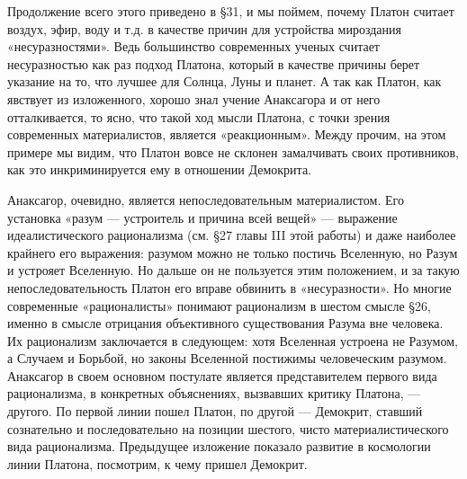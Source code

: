 Продолжение  всего  этого  приведено  в   §31,  и  мы  поймем,  почему
Платон  считает  воздух, эфир,  воду  и  т.д.  в качестве  причин  для
устройства мироздания  «несуразностями». Ведь  большинство современных
ученых  считает  несуразностью  как  раз  подход  Платона,  который  в
качестве  причины  берет  указание  на  то,  что  лучшее  для  Солнца,
Луны  и  планет.  А  так  как Платон,  как  явствует  из  изложенного,
хорошо знал  учение Анаксагора и  от него отталкивается, то  ясно, что
такой  ход мысли  Платона, с  точки зрения  современных материалистов,
является «реакционным».  Между прочим, на  этом примере мы  видим, что
Платон  вовсе  не  склонен  замалчивать  своих  противников,  как  это
инкриминируется ему в отношении Демокрита.

Анаксагор,  очевидно, является  непоследовательным материалистом.  Его
установка «разум  --- устроитель и  причина всей вещей»  --- выражение
идеалистического рационализма (см.  §27 главы III этой  работы) и даже
наиболее  крайнего  его выражения:  разумом  можно  не только  постичь
Вселенную, но Разум  и устрояет Вселенную. Но дальше  он не пользуется
этим  положением, и  за такую  непоследовательность Платон  его вправе
обвинить  в  «несуразности».   Но  многие  современные  «рационалисты»
понимают рационализм  в шестом смысле  §26, именно в  смысле отрицания
объективного  существования   Разума  вне  человека.   Их  рационализм
заключается  в  следующем:  хотя  Вселенная  устроена  не  Разумом,  а
Случаем и Борьбой, но законы Вселенной постижимы человеческим разумом.
Анаксагор в  своем основном постулате является  представителем первого
вида  рационализма,   в  конкретных  объяснениях,   вызвавших  критику
Платона,  --- другого.  По первой  линии пошел  Платон, по  другой ---
Демокрит, ставший  сознательно и  последовательно на  позиции шестого,
чисто  материалистического  вида  рационализма.  Предыдущее  изложение
показало развитие в космологии линии Платона, посмотрим, к чему пришел
Демокрит.

